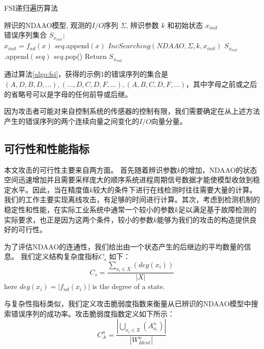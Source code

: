 \begin{algorithm}[h]
  \caption{FSI递归遍历算法}
  \label{algo:fsi}
  \begin{algorithmic}[1]
    \Require %
    辨识的NDAAO模型, 观测的$I/O$序列 $\varSigma$, 辨识参数 $k$ 和初始状态 $x_{init}$ \\  
    
    \Ensure %
    错误序列集合 $S_{x_{init}}$;  \\
      \State $x_{init}=f_{nd}(x)$
      \State $seq$.append$(x)$
      \State $IncSearching(NDAAO,\varSigma,k,x_{init})$
        \State $S_{x_{init}}$.append$(seq)$
      \EndIf
      \State $seq$.pop()
    \EndFor
    \State Return $S_{x_{init}}$
  \end{algorithmic}
\end{algorithm}

通过算法\ref{algo:fsi}，获得的示例1的错误序列的集合是${(A,D,B,D,...),(...,D,C,D,F,...),(A,B,C,D,F,...)}$，其中字母之前或之后的省略号可以是字母的任何前导或后继。

因为攻击者可能对来自控制系统的传感器的控制有限，我们需要确定在从上述方法产生的错误序列的两个连续向量之间变化的$I/O$向量分量。

\subsection{可行性和性能指标}

本文攻击的可行性主要来自两方面。 首先随着辨识参数$ k $的增加，NDAAO的状态空间迅速增加并且需要采样庞大的顺序系统进程周期信号数据才能使模型收敛到稳定水平\parencite{klein2005}。因此，当在精度值$ k $较大的条件下进行在线检测时往往需要大量的计算。 我们的工作主要实现离线攻击，有足够的时间进行计算。其次，考虑到检测机制的稳定性和性能，在实际工业系统中通常一个较小的参数$ k $足以满足基于故障检测的实际要求\parencite{roth2012}，也正是因为这两个条件，较小的参数$ k $能够为我们的攻击的构造提供良好的可行性。

为了评估NDAAO的连通性，我们给出由一个状态产生的后继边的平均数量的信息。 我们定义结构复杂度指标$ C_s $ 如下：
\begin{equation}
C_s= \dfrac{\sum_{x_i\in X} (deg(x_i))}{|X|} 
\end{equation} here $deg(x_i)=|f_{nd}(x_i)|$ is the degree of a state.

与复杂性指标类似，我们定义攻击脆弱度指数来衡量从已辨识的NDAAO模型中搜索错误序列的成功率。攻击脆弱度指数定义如下所示：
\begin{equation}
 C_A^n=\dfrac{|\bigcup_{x_i \in X}(A_{x_i}^n)|}{|W_{Ident}^n|} 
 \end{equation}

